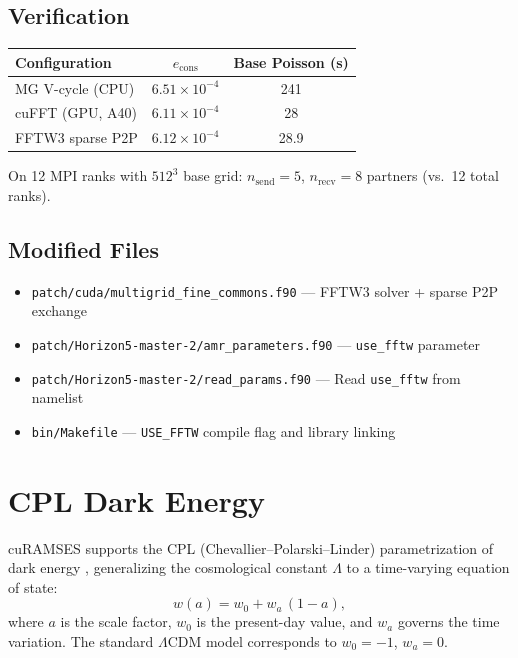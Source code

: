 \documentclass[11pt,fleqn]{book}
\begin{document}
\section{Verification}

\begin{center}
\begin{tabular}{lcc}
\toprule
\textbf{Configuration} & $e_{\text{cons}}$ & \textbf{Base Poisson (s)} \\
\midrule
MG V-cycle (CPU)    & $6.51 \times 10^{-4}$ & 241 \\
cuFFT (GPU, A40)    & $6.11 \times 10^{-4}$ & 28 \\
FFTW3 sparse P2P    & $6.12 \times 10^{-4}$ & 28.9 \\
\bottomrule
\end{tabular}
\end{center}

On 12 MPI ranks with $512^3$ base grid: $n_{\text{send}} = 5$, $n_{\text{recv}} = 8$ partners (vs.\ 12 total ranks).

\section{Modified Files}

\begin{itemize}[nosep]
  \item \texttt{patch/cuda/multigrid\_fine\_commons.f90} --- FFTW3 solver + sparse P2P exchange
  \item \texttt{patch/Horizon5-master-2/amr\_parameters.f90} --- \texttt{use\_fftw} parameter
  \item \texttt{patch/Horizon5-master-2/read\_params.f90} --- Read \texttt{use\_fftw} from namelist
  \item \texttt{bin/Makefile} --- \texttt{USE\_FFTW} compile flag and library linking
\end{itemize}


\chapter{CPL Dark Energy}
\label{ch:cpl}

cuRAMSES supports the CPL (Chevallier--Polarski--Linder) parametrization of dark energy \cite{Chevallier2001,Linder2003}, generalizing the cosmological constant $\Lambda$ to a time-varying equation of state:
\begin{equation}\label{eq:cpl_w}
  w(a) = w_0 + w_a\,(1 - a),
\end{equation}
where $a$ is the scale factor, $w_0$ is the present-day value, and $w_a$ governs the time variation.  The standard $\Lambda$CDM model corresponds to $w_0 = -1$, $w_a = 0$.
\end{document}
